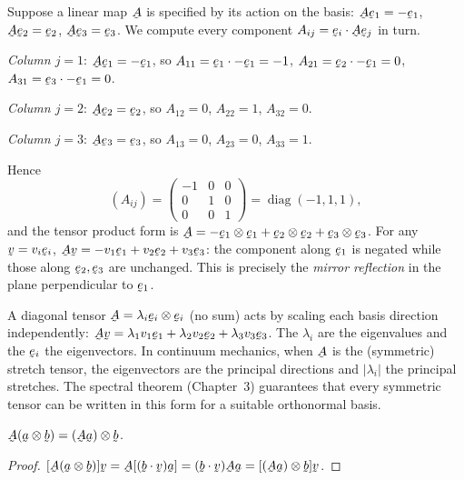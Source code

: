 \begin{example}\label{ex:diag}
Suppose a linear map $\bA$ is specified by its action on the basis:
$\bA\be_{1}=-\be_{1}$, $\bA\be_{2}=\be_{2}$, $\bA\be_{3}=\be_{3}$.
We compute every component $A_{ij}=\ip{\be_{i}}{\bA\be_{j}}$ in turn.

\emph{Column $j=1$}: $\bA\be_{1}=-\be_{1}$, so
$A_{11}=\ip{\be_{1}}{-\be_{1}}=-1$,
$A_{21}=\ip{\be_{2}}{-\be_{1}}=0$,
$A_{31}=\ip{\be_{3}}{-\be_{1}}=0$.

\emph{Column $j=2$}: $\bA\be_{2}=\be_{2}$, so
$A_{12}=0$, $A_{22}=1$, $A_{32}=0$.

\emph{Column $j=3$}: $\bA\be_{3}=\be_{3}$, so
$A_{13}=0$, $A_{23}=0$, $A_{33}=1$.

Hence
\[
(A_{ij})=\begin{pmatrix}-1&0&0\\0&1&0\\0&0&1\end{pmatrix}
=\operatorname{diag}(-1,1,1),
\]
and the tensor product form is
$\bA=-\be_{1}\otimes\be_{1}+\be_{2}\otimes\be_{2}+\be_{3}\otimes\be_{3}$.
For any $\bv=v_i\be_i$,
$\bA\bv=-v_1\be_1+v_2\be_2+v_3\be_3$: the component along $\be_1$ is
negated while those along $\be_2,\be_3$ are unchanged. This is precisely
the \emph{mirror reflection} in the plane perpendicular to $\be_1$.
\end{example}

\begin{remark}\label{rem:diag}
A diagonal tensor $\bA=\lambda_i\be_i\otimes\be_i$ (no sum) acts by
scaling each basis direction independently:
$\bA\bv=\lambda_1v_1\be_1+\lambda_2v_2\be_2+\lambda_3v_3\be_3$. The
$\lambda_i$ are the eigenvalues and the $\be_i$ the eigenvectors. In
continuum mechanics, when $\bA$ is the (symmetric) stretch tensor, the
eigenvectors are the principal directions and $|\lambda_i|$ the principal
stretches. The spectral theorem (Chapter~3) guarantees that every
symmetric tensor can be written in this form for a suitable orthonormal
basis.
\end{remark}

\begin{lemma}\label{lem:Aab}
$\bA(\ba\otimes\bb)=(\bA\ba)\otimes\bb$.
\end{lemma}

\begin{proof}
$[\bA(\ba\otimes\bb)]\bv=\bA[(\ip\bb\bv)\ba]=(\ip\bb\bv)\bA\ba
=[(\bA\ba)\otimes\bb]\bv$.
\end{proof}

